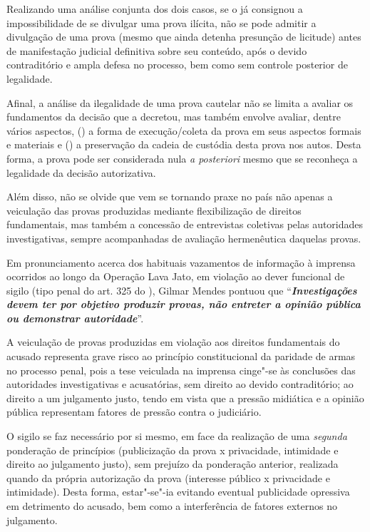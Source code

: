 Realizando uma análise conjunta dos dois casos, se o  já consignou a
impossibilidade de se divulgar uma prova ilícita, não se pode admitir a
divulgação de uma prova (mesmo que ainda detenha presunção de licitude)
antes de manifestação judicial definitiva sobre seu conteúdo, após o
devido contraditório e ampla defesa no processo, bem como sem controle
posterior de legalidade.

Afinal, a análise da ilegalidade de uma prova cautelar não se limita a
avaliar os fundamentos da decisão que a decretou, mas também envolve
avaliar, dentre vários aspectos, () a forma de execução/coleta da prova
em seus aspectos formais e materiais e () a preservação da cadeia de
custódia desta prova nos autos. Desta forma, a prova pode ser
considerada nula \emph{a posteriori} mesmo que se reconheça a legalidade
da decisão autorizativa.

Além disso, não se olvide que vem se tornando praxe no país não apenas a
veiculação das provas produzidas mediante flexibilização de direitos
fundamentais, mas também a concessão de entrevistas coletivas pelas
autoridades investigativas, sempre acompanhadas de avaliação
hermenêutica daquelas provas.

Em pronunciamento acerca dos habituais vazamentos de informação à
imprensa ocorridos ao longo da Operação Lava Jato, em violação ao dever
funcional de sigilo (tipo penal do art. 325 do ), Gilmar Mendes
pontuou que ``\emph{\textbf{\emph{Investigações devem ter por objetivo
produzir provas, não entreter a opinião pública ou demonstrar
autoridade}}}''.

A veiculação de provas produzidas em violação aos direitos fundamentais
do acusado representa grave risco ao princípio constitucional da
paridade de armas no processo penal, pois a tese veiculada na imprensa
cinge"-se às conclusões das autoridades investigativas e acusatórias, sem
direito ao devido contraditório; ao direito a um julgamento justo, tendo
em vista que a pressão midiática e a opinião pública representam fatores
de pressão contra o judiciário.

O sigilo se faz necessário por si mesmo, em face da realização de uma
\emph{segunda} ponderação de princípios (publicização da prova x
privacidade, intimidade e direito ao julgamento justo), sem prejuízo da
ponderação anterior, realizada quando da própria autorização da prova
(interesse público x privacidade e intimidade). Desta forma, estar"-se"-ia
evitando eventual publicidade opressiva em detrimento do acusado, bem
como a interferência de fatores externos no julgamento.

